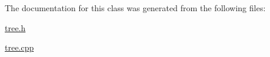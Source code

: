 The documentation for this class was generated from the following files\+:\begin{DoxyCompactItemize}
\item 
\hyperlink{tree_8h}{tree.\+h}\item 
\hyperlink{tree_8cpp}{tree.\+cpp}\end{DoxyCompactItemize}
